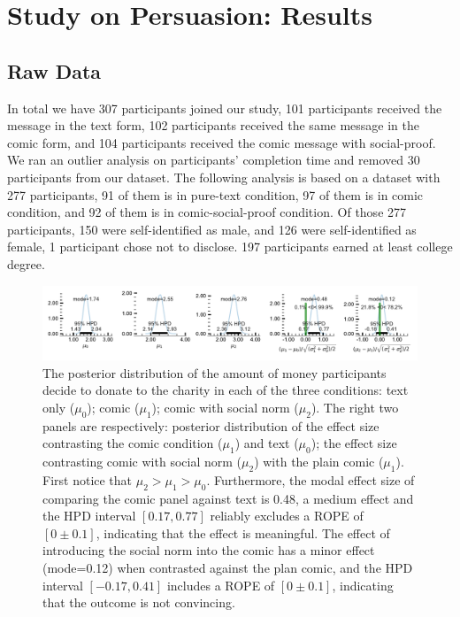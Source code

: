\section{Study on Persuasion: Results}
\label{sec:Study on Behavior Results}

\subsection{Raw Data}
\label{sub:Study on Behavior Raw Data}
In total we have 307 participants joined our study, 101 participants received the message in the text form, 102 participants received the same message in the comic form, and 104 participants received the comic message with social-proof. We ran an outlier analysis on participants' completion time and removed 30 participants from our dataset. The following analysis is based on a dataset with 277 participants, 91 of them is in pure-text condition, 97 of them is in comic condition, and 92 of them is in comic-social-proof condition. Of those 277 participants, 150 were self-identified as male, and 126 were self-identified as female, 1 participant chose not to disclose. 197 participants earned at least college degree.

\begin{figure}[htb]
	\includegraphics[width=1\textwidth]{./hari-code/new_exp_text_v_comic_v_social.pdf}
    \caption{The posterior distribution of the amount of money participants decide to donate to the charity in each of the three conditions: text only ($\mu_0$); comic ($\mu_1$); comic with social norm ($\mu_2$). The right two panels are respectively: posterior distribution of the effect size contrasting the comic condition ($\mu_1$) and text ($\mu_0$); the effect size contrasting comic with social norm ($\mu_2$) with the plain comic ($\mu_1$). First notice that $\mu_2 > \mu_1 > \mu_0$. Furthermore, the modal effect size of comparing the comic panel against text is 0.48, a medium effect and the HPD interval $[0.17, 0.77]$ reliably excludes a ROPE of $[0 \pm 0.1]$, indicating that the effect is meaningful. The effect of introducing the social norm into the comic has a minor effect (mode=0.12) when contrasted against the plan comic, and the HPD interval $[-0.17, 0.41]$ includes a ROPE of $[0 \pm 0.1]$, indicating that the outcome is not convincing.}
	\label{fig:main-experiment2-effect}
\end{figure}

